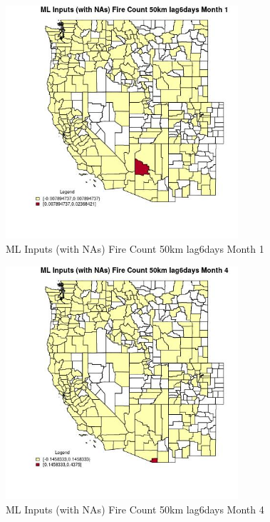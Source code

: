 \clearpage 

\begin{figure} 
\centering  
\includegraphics[width=0.77\textwidth]{Code_Outputs/Report_ML_input_PM25_Step4_part_e_de_duplicated_aves_compiled_2019-05-20wNAs_CountyFire_Count_50km_lag6daysmedianMonth1.jpg} 
\caption{\label{fig:Report_ML_input_PM25_Step4_part_e_de_duplicated_aves_compiled_2019-05-20wNAsCountyFire_Count_50km_lag6daysmedianMonth1}ML Inputs (with NAs) Fire Count 50km lag6days Month 1} 
\end{figure} 
 

\begin{figure} 
\centering  
\includegraphics[width=0.77\textwidth]{Code_Outputs/Report_ML_input_PM25_Step4_part_e_de_duplicated_aves_compiled_2019-05-20wNAs_CountyFire_Count_50km_lag6daysmedianMonth4.jpg} 
\caption{\label{fig:Report_ML_input_PM25_Step4_part_e_de_duplicated_aves_compiled_2019-05-20wNAsCountyFire_Count_50km_lag6daysmedianMonth4}ML Inputs (with NAs) Fire Count 50km lag6days Month 4} 
\end{figure} 
 

